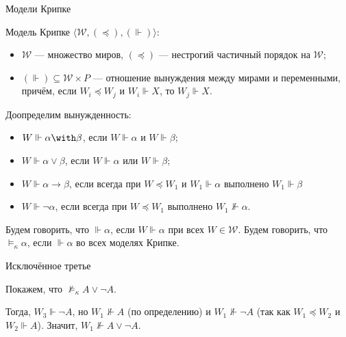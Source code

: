 \documentclass[aspectratio=169]{beamer}
\begin{document}
\begin{frame}{Модели Крипке}
\begin{defrus}Модель Крипке $\langle \mathcal{W}, (\preceq), (\Vdash)\rangle$:
\begin{itemize}
\item $\mathcal{W}$ --- множество миров, $(\preceq)$ --- нестрогий частичный порядок на $\mathcal{W}$;
\item $(\Vdash)\subseteq \mathcal{W}\times P$ --- отношение вынуждения
между мирами и переменными, причём, если $W_i \preceq W_j$ и $W_i \Vdash X$, то $W_j \Vdash X$.
\end{itemize}
\end{defrus}

Доопределим вынужденность:
\begin{itemize}
\item $W \Vdash \alpha\with\beta$, если $W \Vdash \alpha$ и $W \Vdash \beta$;
\item $W \Vdash \alpha\vee\beta$, если $W \Vdash \alpha$ или $W \Vdash \beta$;
\item $W \Vdash \alpha\rightarrow\beta$, если всегда при $W \preceq W_1$ и $W_1 \Vdash \alpha$ выполнено $W_1 \Vdash \beta$
\item $W \Vdash \neg\alpha$, если всегда при $W \preceq W_1$ выполнено $W_1 \not\Vdash \alpha$.
\end{itemize}

Будем говорить, что $\Vdash\alpha$, если $W\Vdash\alpha$ при всех $W \in \mathcal{W}$.
Будем говорить, что $\models_\kappa\alpha$, если $\Vdash\alpha$ во всех моделях Крипке.
\end{frame}

\begin{frame}{Исключённое третье}
\begin{exmprus}
Покажем, что $\not\models_\kappa A \vee \neg A$. 
\begin{center}\end{center}

Тогда, $W_3 \Vdash \neg A$, но $W_1 \not\Vdash A$ (по определению) и $W_1 \not\Vdash \neg A$ (так как
$W_1 \preceq W_2$ и $W_2 \Vdash A$). Значит, $W_1 \not\Vdash A \vee \neg A$.
\end{exmprus}
\end{frame}
\end{document}
